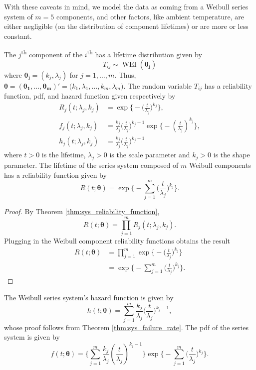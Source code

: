 \documentclass[
]{article}
\begin{document}
With these caveats in mind, we model the data as coming from a Weibull
series system of \(m = 5\) components, and other factors, like ambient
temperature, are either negligible (on the distribution of component
lifetimes) or are more or less constant.

The \(j\)\textsuperscript{th} component of the \(i\)\textsuperscript{th}
has a lifetime distribution given by \[
    T_{i j} \sim \operatorname{WEI}(\boldsymbol{\theta_j})
\] where \(\boldsymbol{\theta_j} = (k_j, \lambda_j)\) for
\(j=1,\ldots,m\). Thus,
\(\boldsymbol{\theta }= (\boldsymbol{\theta_1},\ldots,\boldsymbol{\theta_m})' = \bigl(k_1,\lambda_1,\ldots,k_m,\lambda_m\bigr)\).
The random variable \(T_{i j}\) has a reliability function, pdf, and
hazard function given respectively by \begin{align}
    R_j(t;\lambda_j,k_j)
        &= \exp\biggl\{-\biggl(\frac{t}{\lambda_j}\biggr)^{k_j}\biggr\},\\
    f_j(t;\lambda_j,k_j)
        &= \frac{k_j}{\lambda_j}\biggl(\frac{t}{\lambda_j}\biggr)^{k_j-1}
        \exp\biggl\{-\left(\frac{t}{\lambda_j}\right)^{k_j} \biggr\},\\
    h_j(t;\lambda_j,k_j) \label{eq:weibull_haz}
        &= \frac{k_j}{\lambda_j}\biggl(\frac{t}{\lambda_j}\biggr)^{k_j-1}
\end{align} where \(t > 0\) is the lifetime, \(\lambda_j > 0\) is the
scale parameter and \(k_j > 0\) is the shape parameter. The lifetime of
the series system composed of \(m\) Weibull components has a reliability
function given by \begin{equation}
\label{eq:sys_weibull_reliability_function}
R(t;\boldsymbol{\theta}) = \exp\biggl\{-\sum_{j=1}^{m}\biggl(\frac{t}{\lambda_j}\biggr)^{k_j}\biggr\}.
\end{equation}

\begin{proof}
By Theorem \ref{thm:sys_reliability_function},
$$
R(t;\boldsymbol{\theta}) = \prod_{j=1}^{m} R_j(t;\lambda_j,k_j).
$$
Plugging in the Weibull component reliability functions obtains the result
\begin{align*}
R(t;\boldsymbol{\theta})
    &= \prod_{j=1}^{m} \exp\biggl\{-\biggl(\frac{t}{\lambda_j}\biggr)^{k_j}\biggr\}\\
    &= \exp\biggl\{-\sum_{j=1}^{m}\biggl(\frac{t}{\lambda_j}\biggr)^{k_j}\biggr\}.
\end{align*}
\end{proof}

The Weibull series system's hazard function is given by \begin{equation}
\label{eq:sys_weibull_failure_rate_function}
h(t;\boldsymbol{\theta}) =
    \sum_{j=1}^{m} \frac{k_j}{\lambda_j}\biggl(\frac{t}{\lambda_j}\biggr)^{k_j-1},
\end{equation} whose proof follows from Theorem
\ref{thm:sys_failure_rate}. The pdf of the series system is given by
\begin{equation}
\label{eq:sys_weibull_pdf}
f(t;\boldsymbol{\theta}) =
\biggl\{
    \sum_{j=1}^m \frac{k_j}{\lambda_j}\left(\frac{t}{\lambda_j}\right)^{k_j-1}
\biggr\}
\exp
\biggl\{
    -\sum_{j=1}^m \bigl(\frac{t}{\lambda_j}\bigr)^{k_j}
\biggr\}.
\end{equation}
\end{document}

